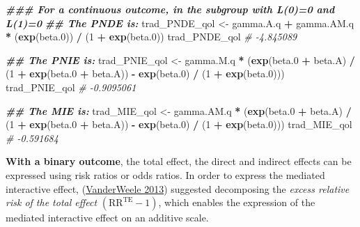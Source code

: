 \documentclass[
]{book}
\newenvironment{Shaded}{\begin{snugshade}}{\end{snugshade}}
\newcommand{\CommentTok}[1]{\textcolor[rgb]{0.56,0.35,0.01}{\textit{#1}}}
\newcommand{\DecValTok}[1]{\textcolor[rgb]{0.00,0.00,0.81}{#1}}
\newcommand{\DocumentationTok}[1]{\textcolor[rgb]{0.56,0.35,0.01}{\textbf{\textit{#1}}}}
\newcommand{\FloatTok}[1]{\textcolor[rgb]{0.00,0.00,0.81}{#1}}
\newcommand{\FunctionTok}[1]{\textcolor[rgb]{0.13,0.29,0.53}{\textbf{#1}}}
\newcommand{\NormalTok}[1]{#1}
\newcommand{\OtherTok}[1]{\textcolor[rgb]{0.56,0.35,0.01}{#1}}
\newcommand{\SpecialCharTok}[1]{\textcolor[rgb]{0.81,0.36,0.00}{\textbf{#1}}}
\begin{document}
\begin{Shaded}
\begin{Highlighting}[]
\DocumentationTok{\#\#\# For a continuous outcome, in the subgroup with L(0)=0 and L(1)=0}
\DocumentationTok{\#\# The PNDE is:}
\NormalTok{trad\_PNDE\_qol }\OtherTok{\textless{}{-}}\NormalTok{ gamma.A.q }\SpecialCharTok{+}\NormalTok{ gamma.AM.q }\SpecialCharTok{*}\NormalTok{ (}\FunctionTok{exp}\NormalTok{(beta}\FloatTok{.0}\NormalTok{)) }\SpecialCharTok{/}\NormalTok{ (}\DecValTok{1} \SpecialCharTok{+} \FunctionTok{exp}\NormalTok{(beta}\FloatTok{.0}\NormalTok{))}
\NormalTok{trad\_PNDE\_qol}
\CommentTok{\# {-}4.845089}

\DocumentationTok{\#\# The PNIE is:}
\NormalTok{trad\_PNIE\_qol }\OtherTok{\textless{}{-}}\NormalTok{ gamma.M.q }\SpecialCharTok{*}
\NormalTok{  (}\FunctionTok{exp}\NormalTok{(beta}\FloatTok{.0} \SpecialCharTok{+}\NormalTok{ beta.A) }\SpecialCharTok{/}
\NormalTok{     (}\DecValTok{1} \SpecialCharTok{+} \FunctionTok{exp}\NormalTok{(beta}\FloatTok{.0} \SpecialCharTok{+}\NormalTok{ beta.A)) }\SpecialCharTok{{-}} \FunctionTok{exp}\NormalTok{(beta}\FloatTok{.0}\NormalTok{) }\SpecialCharTok{/}\NormalTok{ (}\DecValTok{1} \SpecialCharTok{+} \FunctionTok{exp}\NormalTok{(beta}\FloatTok{.0}\NormalTok{)))}
\NormalTok{trad\_PNIE\_qol}
\CommentTok{\# {-}0.9095061}

\DocumentationTok{\#\# The MIE is:}
\NormalTok{trad\_MIE\_qol }\OtherTok{\textless{}{-}}\NormalTok{ gamma.AM.q }\SpecialCharTok{*}
\NormalTok{  (}\FunctionTok{exp}\NormalTok{(beta}\FloatTok{.0} \SpecialCharTok{+}\NormalTok{ beta.A) }\SpecialCharTok{/}\NormalTok{ (}\DecValTok{1} \SpecialCharTok{+} \FunctionTok{exp}\NormalTok{(beta}\FloatTok{.0} \SpecialCharTok{+}\NormalTok{ beta.A)) }\SpecialCharTok{{-}}
     \FunctionTok{exp}\NormalTok{(beta}\FloatTok{.0}\NormalTok{) }\SpecialCharTok{/}\NormalTok{ (}\DecValTok{1} \SpecialCharTok{+} \FunctionTok{exp}\NormalTok{(beta}\FloatTok{.0}\NormalTok{)))}
\NormalTok{trad\_MIE\_qol}
\CommentTok{\# {-}0.591684}
\end{Highlighting}
\end{Shaded}

\textbf{With a binary outcome}, the total effect, the direct and indirect effects can be expressed using risk ratios or odds ratios. In order to express the mediated interactive effect, (\protect\hyperlink{ref-vanderweele2013}{VanderWeele 2013}) suggested decomposing the \emph{excess relative risk of the total effect} \((\text{RR}^{\text{TE}}-1)\), which enables the expression of the mediated interactive effect on an additive scale.
\end{document}
